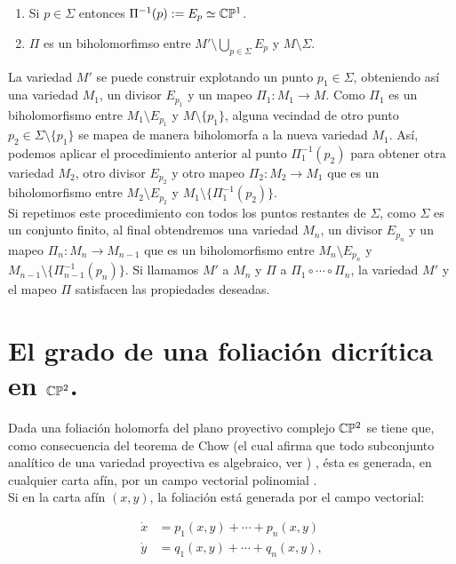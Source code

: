 \begin{enumerate}
\item Si $p\in\Sigma$ entonces $\Pi^{-1}(p):=E_{p}\simeq\mathbb{C}\mathbb{P}^{1}$.
\item $\Pi$ es un biholomorfimso entre $M'\setminus \bigcup_{p\in\Sigma} E_{p}$ y $M\setminus\Sigma$.
\end{enumerate}

La variedad $M'$ se puede construir explotando un punto $p_{1}\in\Sigma$, obteniendo así una variedad $M_{1}$, un divisor $E_{p_{1}}$ y un mapeo $\Pi_{1}\colon M_{1}\rightarrow M$. Como $\Pi_{1}$ es un biholomorfismo entre $M_{1}\setminus E_{p_{1}}$ y $M\setminus \{p_{1}\}$, alguna vecindad de otro punto $p_{2}\in\Sigma\setminus \{p_{1}\}$ se mapea de manera biholomorfa a la nueva variedad $M_{1}$. Así, podemos aplicar el procedimiento anterior al punto $\Pi^{-1}_{1}(p_{2})$ para obtener otra variedad $M_{2}$, otro divisor $E_{p_{2}}$ y otro mapeo $\Pi_{2}\colon M_{2}\rightarrow M_{1}$ que es un biholomorfismo entre $M_{2}\setminus E_{p_{2}}$ y $M_{1}\setminus \{\Pi^{-1}_{1}(p_{2})\}$.\\ 

Si repetimos este procedimiento con todos los puntos restantes de $\Sigma$, como $\Sigma$ es un conjunto finito, al final obtendremos una variedad $M_{n}$, un divisor $E_{p_{n}}$ y un mapeo $\Pi_{n}\colon M_{n}\rightarrow M_{n-1}$ que es un biholomorfismo entre $M_{n}\setminus E_{p_{n}}$ y $M_{n-1}\setminus \{\Pi^{-1}_{n-1}(p_{n})\}$. Si llamamos $M'$ a $M_{n}$ y $\Pi$ a $\Pi_{1}\circ\cdots\circ\Pi_{n}$, la variedad $M'$ y el mapeo $\Pi$ satisfacen las propiedades deseadas.   
 
\section{El grado de una foliación dicrítica en $\mathbb{C}\mathbb{P}^{2}$.}

Dada una foliación holomorfa del plano proyectivo complejo $\mathbb{C}\mathbb{P}^2$ se tiene que, como consecuencia del teorema de Chow (el cual afirma que todo subconjunto analítico de una variedad proyectiva es algebraico, ver \cite{Mumford}) , ésta es generada, en cualquier carta afín, por un campo vectorial polinomial \cite[p.~477]{IlyaYako}.\\

Si en la carta afín $(x,y)$, la foliación está generada por el campo vectorial:

\begin{equation}
\label{EcuacionEnCP2}
\begin{aligned}
\dot{x} &=p_{1}(x,y)+\cdots+p_{n}(x,y)\\
\dot{y} &=q_{1}(x,y)+\cdots+q_{n}(x,y),
\end{aligned}
\end{equation}

